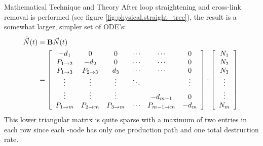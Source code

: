 \begin{chapter}{Mathematical Technique and Theory\label{chap:math}}
  After loop straightening and cross-link removal is performed (see
  figure \ref{fig:physical.straight_tree}), the result is a somewhat
  larger, simpler set of ODE's:
  \begin{equation}
    \begin{split}
      \dot{\vec{N}}(t) &= \mbox{$\mathbf{B}$}\vec{N}(t)\\
        &= \left [
          \begin{array}{cccccc}
            -d_1 & 0 & 0 & \cdots & \cdots & 0 \\
            P_{1\rightarrow 2} & -d_2 & 0 & \cdots & \cdots & 0\\
            P_{1\rightarrow 3} & P_{2\rightarrow 3} & d_3 & \cdots & \cdots & 0 \\
            \vdots & \vdots & \vdots & \ddots &  & \vdots\\
            \vdots & \vdots & \vdots & & -d_{m-1} & 0\\
            P_{1\rightarrow m} & P_{2\rightarrow m} & P_{3\rightarrow m} & \cdots & P_{m-1\rightarrow m} & -d_m
          \end{array} \right ] \cdot \left [
          \begin{array}{c}
            N_1 \\ N_2 \\ N_3 \\ \vdots \\ \vdots \\ N_m
          \end{array} \right ]_.\label{eq:math.intro.tree}
    \end{split}
  \end{equation}
  This lower triangular matrix is quite sparse with a maximum of two
  entries in each row since each \pc-node has only one production path
  and one total destruction rate.
  

\end{chapter}
